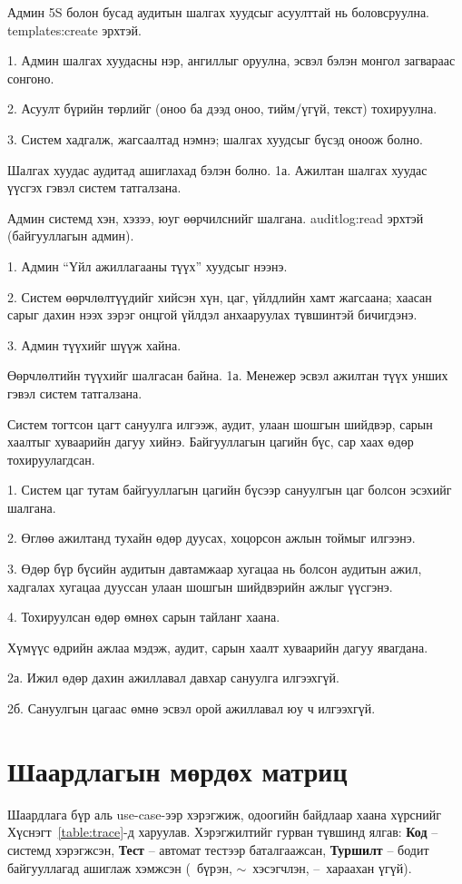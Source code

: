 {Админ 5S болон бусад аудитын шалгах хуудсыг асуулттай нь боловсруулна.}
{templates:create эрхтэй.}
{1. Админ шалгах хуудасны нэр, ангиллыг оруулна, эсвэл бэлэн монгол загвараас сонгоно.\par
 2. Асуулт бүрийн төрлийг (оноо ба дээд оноо, тийм/үгүй, текст) тохируулна.\par
 3. Систем хадгалж, жагсаалтад нэмнэ; шалгах хуудсыг бүсэд оноож болно.}
{Шалгах хуудас аудитад ашиглахад бэлэн болно.}
{1а. Ажилтан шалгах хуудас үүсгэх гэвэл систем татгалзана.}

{Админ системд хэн, хэзээ, юуг өөрчилснийг шалгана.}
{auditlog:read эрхтэй (байгууллагын админ).}
{1. Админ ``Үйл ажиллагааны түүх'' хуудсыг нээнэ.\par
 2. Систем өөрчлөлтүүдийг хийсэн хүн, цаг, үйлдлийн хамт жагсаана; хаасан сарыг дахин нээх зэрэг онцгой үйлдэл анхааруулах түвшинтэй бичигдэнэ.\par
 3. Админ түүхийг шүүж хайна.}
{Өөрчлөлтийн түүхийг шалгасан байна.}
{1а. Менежер эсвэл ажилтан түүх унших гэвэл систем татгалзана.}

{Систем тогтсон цагт сануулга илгээж, аудит, улаан шошгын шийдвэр, сарын хаалтыг хуваарийн дагуу хийнэ.}
{Байгууллагын цагийн бүс, сар хаах өдөр тохируулагдсан.}
{1. Систем цаг тутам байгууллагын цагийн бүсээр сануулгын цаг болсон эсэхийг шалгана.\par
 2. Өглөө ажилтанд тухайн өдөр дуусах, хоцорсон ажлын тоймыг илгээнэ.\par
 3. Өдөр бүр бүсийн аудитын давтамжаар хугацаа нь болсон аудитын ажил, хадгалах хугацаа дууссан улаан шошгын шийдвэрийн ажлыг үүсгэнэ.\par
 4. Тохируулсан өдөр өмнөх сарын тайланг хаана.}
{Хүмүүс өдрийн ажлаа мэдэж, аудит, сарын хаалт хуваарийн дагуу явагдана.}
{2а. Ижил өдөр дахин ажиллавал давхар сануулга илгээхгүй.\par
 2б. Сануулгын цагаас өмнө эсвэл орой ажиллавал юу ч илгээхгүй.}

\section{Шаардлагын мөрдөх матриц}
Шаардлага бүр аль use-case-ээр хэрэгжиж, одоогийн байдлаар хаана хүрснийг Хүснэгт~\ref{table:trace}-д харуулав. Хэрэгжилтийг гурван түвшинд ялгав: \textbf{Код} -- системд хэрэгжсэн, \textbf{Тест} -- автомат тестээр баталгаажсан, \textbf{Туршилт} -- бодит байгууллагад ашиглаж хэмжсэн (\yes~бүрэн, $\sim$~хэсэгчлэн, --~хараахан үгүй).

